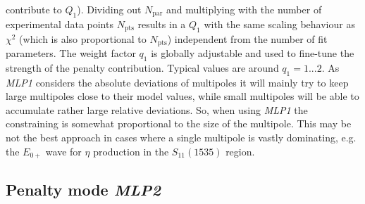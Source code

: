 \documentclass[a4paper,10pt]{article}
\begin{document}
contribute to $Q_1$). Dividing out $N_\mathrm{par}$ and multiplying with the number of experimental data points
$N_\mathrm{pts}$ results in a $Q_1$ with the same scaling behaviour as $\chi^2$ (which is also proportional to $N_\mathrm{pts}$)
independent from the number of fit parameters.
The weight factor $q_1$ is globally adjustable and used to fine-tune the strength of the penalty contribution. Typical
values are around $q_1 = 1...2$.
As \textit{MLP1} considers the absolute deviations of multipoles it will mainly try to keep large multipoles close to their model values,
while small multipoles will be able to accumulate rather large relative deviations. So, when using \textit{MLP1} the
constraining is somewhat proportional to the size of the multipole. This may be not the best approach in cases where a single multipole
is vastly dominating, e.g. the $E_{0+}$ wave for $\eta$ production in the $S_{11}(1535)$ region.

\subsection{Penalty mode \textit{MLP2}}
\end{document}
